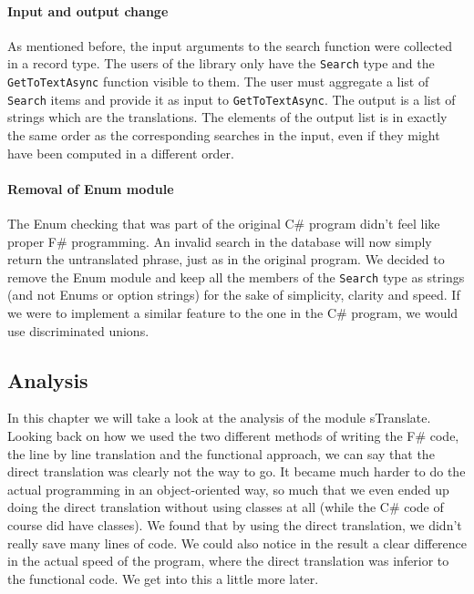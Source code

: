 \documentclass[12pt, a4paper]{article}
\newcommand{\code}[1]{{\small \texttt{#1}}}
\begin{document}
\paragraph{Input and output change} As mentioned before, the input arguments to the search function were collected in a record type. The users of the library only have the \code{Search} type and the \code{GetToTextAsync} function visible to them. The user must aggregate a list of \code{Search} items and provide it as input to \code{GetToTextAsync}. The output is a list of strings which are the translations. The elements of the output list is in exactly the same order as the corresponding searches in the input, even if they might have been computed in a different order.

\paragraph{Removal of Enum module} The Enum checking that was part of the original C\# program didn't feel like proper F\# programming. An invalid search in the database will now simply return the untranslated phrase, just as in the original program. We decided to remove the Enum module and keep all the members of the \code{Search} type as strings (and not Enums or option strings) for the sake of simplicity, clarity and speed. If we were to implement a similar feature to the one in the C\# program, we would use discriminated unions.

\newpage


\subsection{Analysis}
In this chapter we will take a look at the analysis of the module sTranslate.
Looking back on how we used the two different methods of writing the F\# code, the line by line translation and the functional approach, we can say that the direct translation was clearly not the way to go. It became much harder to do the actual programming in an object-oriented way, so much that we even ended up doing the direct translation without using classes at all (while the C\# code of course did have classes). We found that by using the direct translation, we didn't really save many lines of code. We could also notice in the result a clear difference in the actual speed of the program, where the direct translation was inferior to the functional code. We get into this a little more later.
\end{document}
